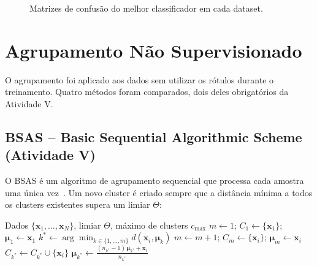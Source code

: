 \documentclass[12pt, a4paper]{article}
\newcommand{\bx}{\mathbf{x}}
\newcommand{\bmu}{\boldsymbol{\mu}}
\begin{document}
\begin{figure}[H]
    \centering
    \hfill
    \caption{Matrizes de confusão do melhor classificador em cada dataset.}
    \label{fig:matconf}
\end{figure}

\section{Agrupamento Não Supervisionado}
\label{sec:agrupamento}

O agrupamento foi aplicado aos dados sem utilizar os rótulos durante o treinamento. Quatro métodos foram comparados, dois deles obrigatórios da Atividade V.

\subsection{BSAS -- Basic Sequential Algorithmic Scheme (Atividade V)}
\label{sec:bsas}

O BSAS é um algoritmo de agrupamento sequencial que processa cada amostra uma única vez~\cite{theodoridis2008}. Um novo cluster é criado sempre que a distância mínima a todos os clusters existentes supera um limiar $\Theta$:

\begin{algorithm}[H]
\caption{Basic Sequential Algorithmic Scheme (BSAS)}
\label{alg:bsas}
\begin{algorithmic}[1]
\Require Dados $\{\bx_1, \ldots, \bx_N\}$, limiar $\Theta$, máximo de clusters $c_{\max}$
\State $m \leftarrow 1$; $C_1 \leftarrow \{\bx_1\}$; $\bmu_1 \leftarrow \bx_1$
    \State $k^* \leftarrow \arg\min_{k \in \{1,\ldots,m\}} d(\bx_i, \bmu_k)$
    \If{$d(\bx_i, \bmu_{k^*}) > \Theta$ \textbf{and} $m < c_{\max}$}
        \State $m \leftarrow m + 1$; $C_m \leftarrow \{\bx_i\}$; $\bmu_m \leftarrow \bx_i$
    \Else
        \State $C_{k^*} \leftarrow C_{k^*} \cup \{\bx_i\}$
        \State $\bmu_{k^*} \leftarrow \frac{(n_{k^*}-1)\,\bmu_{k^*} + \bx_i}{n_{k^*}}$ 
    \EndIf
\EndFor
\end{algorithmic}
\end{algorithm}
\end{document}
